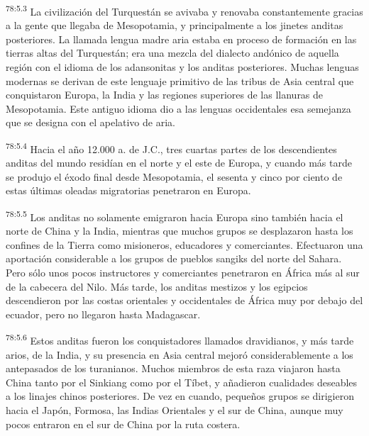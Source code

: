 \par
\textsuperscript{78:5.3} La civilización del Turquestán se avivaba y renovaba constantemente gracias a la gente que llegaba de Mesopotamia, y principalmente a los jinetes anditas posteriores. La llamada lengua madre aria estaba en proceso de formación en las tierras altas del Turquestán; era una mezcla del dialecto andónico de aquella región con el idioma de los adansonitas y los anditas posteriores. Muchas lenguas modernas se derivan de este lenguaje primitivo de las tribus de Asia central que conquistaron Europa, la India y las regiones superiores de las llanuras de Mesopotamia. Este antiguo idioma dio a las lenguas occidentales esa semejanza que se designa con el apelativo de aria.

\par
\textsuperscript{78:5.4} Hacia el año 12.000 a. de J.C., tres cuartas partes de los descendientes anditas del mundo residían en el norte y el este de Europa, y cuando más tarde se produjo el éxodo final desde Mesopotamia, el sesenta y cinco por ciento de estas últimas oleadas migratorias penetraron en Europa.

\par
\textsuperscript{78:5.5} Los anditas no solamente emigraron hacia Europa sino también hacia el norte de China y la India, mientras que muchos grupos se desplazaron hasta los confines de la Tierra como misioneros, educadores y comerciantes. Efectuaron una aportación considerable a los grupos de pueblos sangiks del norte del Sahara. Pero sólo unos pocos instructores y comerciantes penetraron en África más al sur de la cabecera del Nilo. Más tarde, los anditas mestizos y los egipcios descendieron por las costas orientales y occidentales de África muy por debajo del ecuador, pero no llegaron hasta Madagascar.

\par
\textsuperscript{78:5.6} Estos anditas fueron los conquistadores llamados dravidianos, y más tarde arios, de la India, y su presencia en Asia central mejoró considerablemente a los antepasados de los turanianos. Muchos miembros de esta raza viajaron hasta China tanto por el Sinkiang como por el Tíbet, y añadieron cualidades deseables a los linajes chinos posteriores. De vez en cuando, pequeños grupos se dirigieron hacia el Japón, Formosa, las Indias Orientales y el sur de China, aunque muy pocos entraron en el sur de China por la ruta costera.


